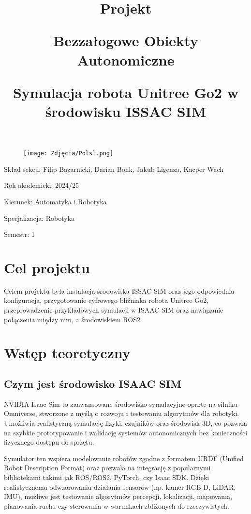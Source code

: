 \documentclass[12pt]{article}
\title{Projekt \par Bezzałogowe Obiekty Autonomiczne  \par \vspace{10pt} \textbf{Symulacja robota Unitree Go2 w środowisku ISSAC SIM}}
\date{}
\begin{document}
\begin{figure}[t]
\centering
    \texttt{[image: Zdjęcia/Polsl.png]}
\end{figure}

\maketitle
\vspace{150pt}
Skład sekcji: Filip Bazarnicki, Darian Bonk, Jakub Ligenza, Kacper Wach

Rok akademicki: 2024/25


Kierunek: Automatyka i Robotyka

Specjalizacja: Robotyka

Semestr: 1


\newpage

\section{Cel projektu}


Celem projektu była instalacja środowiska ISSAC SIM oraz jego odpowiednia konfiguracja, przygotowanie cyfrowego bliźniaka robota Unitree Go2, przeprowadzenie przykładowych symulacji w ISAAC SIM oraz nawiązanie połączenia między nim, a środowiskiem ROS2.

\section{Wstęp teoretyczny}
\subsection{Czym jest środowisko ISAAC SIM}

NVIDIA Isaac Sim to zaawansowane środowisko symulacyjne oparte na silniku Omniverse, stworzone z myślą o rozwoju i testowaniu algorytmów dla robotyki. Umożliwia realistyczną symulację fizyki, czujników oraz środowisk 3D, co pozwala na szybkie prototypowanie i walidację systemów autonomicznych bez konieczności fizycznego dostępu do sprzętu.

Symulator ten wspiera modelowanie robotów zgodne z formatem URDF (Unified Robot Description Format) oraz pozwala na integrację z popularnymi bibliotekami takimi jak ROS/ROS2, PyTorch, czy Isaac SDK. Dzięki realistycznemu odwzorowaniu działania sensorów (np. kamer RGB-D, LiDAR, IMU), możliwe jest testowanie algorytmów percepcji, lokalizacji, mapowania, planowania ruchu czy sterowania w warunkach zbliżonych do rzeczywistych.
\end{document}
